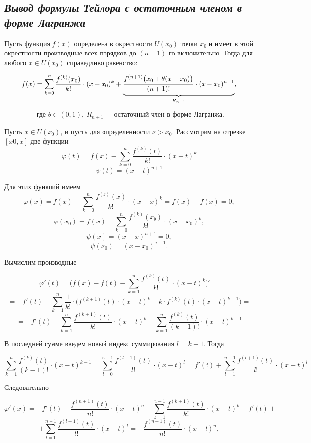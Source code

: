 \subsection{\textit{Вывод формулы Тейлора с остаточным членом в форме Лагранжа}}

Пусть функция $f(x)$ определена в окрестности $U(x_0)$ точки $x_0$ и имеет в этой окрестности производные всех порядков до $(n + 1)$-го включительно. Тогда для любого $x \in U(x_0)$ справедливо равенство:
\begin{mainQuote}

$$f(x) = \sum\limits_{k=0}^n\frac{f^{(k)}(x_0)}{k!}\cdot (x - x_0)^k + \underbrace{\frac{f^{(n+1)}\big(x_0 + \theta(x - x_0)\big)}{(n+1)!}\cdot (x - x_0)^{n + 1}}_{\large R_{n+1}}, $$

$$\text{ где } \theta \in (0, 1), \ R_{n+1} - \text{ остаточный член в форме Лагранжа}.$$
\end{mainQuote}

Пусть $x \in U(x_0)$, и пусть для определенности $x > x_0$. Рассмотрим на отрезке $[x0, x]$ две функции $$\varphi(t) = f(x) - \sum\limits_{k=0}^n\frac{f^{(k)}(t)}{k!}\cdot (x - t)^k$$ $$\psi(t) = (x - t)^{n+1}$$

Для этих функций имеем $$\varphi(x) = f(x) - \sum\limits_{k=0}^n\frac{f^{(k)}(x)}{k!}\cdot (x - x)^k = f(x) - f(x) = 0, $$ $$\varphi(x_0) = f(x) - \sum\limits_{k=0}^n\frac{f^{(k)}(x_0)}{k!}\cdot (x -  x_0)^k,$$ $$\psi(x) = (x - x)^{n+1} = 0,$$ $$\psi(x_0) = (x - x_0)^{n+1}.$$

Вычислим производные

$$\varphi'(t) = \bigg(f(x) - f(t) - \sum\limits_{k=1}^n\frac{f^{(k)}(t)}{k!}\cdot (x - t)^k\bigg)' = $$ $$=-f'(t) - \sum\limits_{k=1}^n \frac{1}{k!}\cdot\bigg(f^{(k+1)}(t) \cdot (x - t)^k - k\cdot f^{(k)}(t)\cdot(x - t)^{k-1}\bigg) =$$ $$= -f'(t) - \sum\limits_{k=1}^n \frac{f^{(k+1)}(t) }{k!}\cdot (x - t)^k + \sum\limits_{k=1}^n\frac{f^{(k)}(t)}{(k - 1)!}\cdot(x - t)^{k-1}  $$

В последней сумме введем новый индекс суммирования $l = k - 1$. Тогда

$$\sum\limits_{k=1}^n\frac{f^{(k)}(t)}{(k - 1)!}\cdot(x - t)^{k-1} = \sum\limits_{l=0}^{n-1}\frac{f^{(l+1)}(t)}{l!}\cdot(x - t)^{l}= f'(t)+ \sum\limits_{l=1}^{n-1}\frac{f^{(l+1)}(t)}{l!}\cdot(x - t)^{l}$$

Следовательно

$$\varphi'(x) = -f'(t) -\frac{f^{(n+1)}(t)}{n!}
\cdot (x - t)^n - \sum\limits_{k=1}^{n-1} \frac{f^{(k+1)}(t) }{k!}\cdot (x - t)^k + f'(t) +$$ $$+ \sum\limits_{l=1}^{n-1} \frac{f^{(l+1)}(t) }{l!}\cdot (x - t)^l = -\frac{f^{(n+1)}(t)}{n!}
\cdot (x - t)^n,$$

